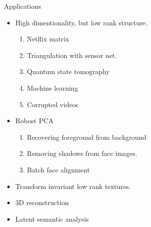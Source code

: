 \documentclass{beamer}
\begin{document}
\begin{frame}{Applications}
	\begin{itemize}
		\item High dimentionality, but low rank structure.
		\begin{enumerate}
			\item Netflix matrix
			\item Triangulation with sensor net.
			\item Quantum state tomography
			\item Machine learning
			\item Corrupted videos
		\end{enumerate}
		\vspace {3mm}
		\item Robost PCA
		\begin{enumerate}
			\item Recovering foreground from background
			\item Removing shadows from face images.
			\item Batch face alignment 
		\end{enumerate}
		\vspace {3mm}
		\item Transform invariant low rank textures.
		\vspace {3mm}
		\item 3D reconstruction
		\vspace {3mm}
		\item Latent semantic analysis
	\end{itemize}
\end{frame}

\end{document}
